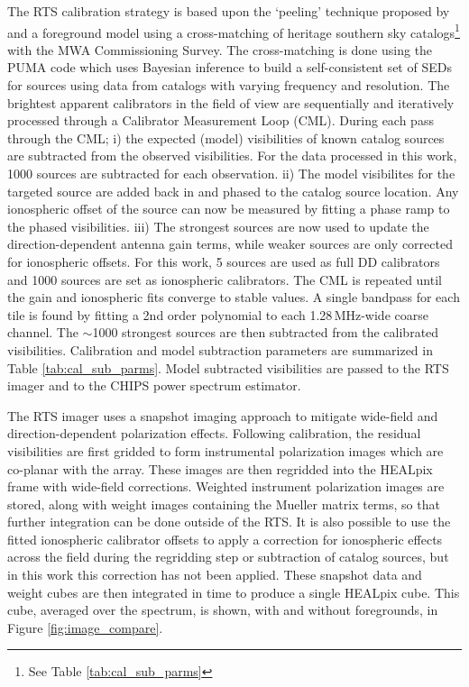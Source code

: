 \documentclass[twolcolumn,iop]{emulateapj}
\begin{document}
The RTS calibration strategy is based upon the `peeling' technique proposed by \cite{Noordam:2004p2379} and a foreground model using a cross-matching of heritage southern sky catalogs\footnote{See Table \ref{tab:cal_sub_parms}} with the MWA Commissioning Survey.  The cross-matching is done using the PUMA code which uses Bayesian inference to build a self-consistent set of SEDs for sources using data from catalogs with varying frequency and resolution. The brightest apparent calibrators in the field of view are sequentially and iteratively processed through a Calibrator Measurement Loop (CML). During each pass through the CML; i) the expected (model) visibilities of known catalog sources are subtracted from the observed visibilities. For the data processed in this work, 1000 sources are subtracted for each observation. ii) The model visibilites for the targeted source are added back in and phased to the catalog source location. Any ionospheric offset of the source can now be measured by fitting a phase ramp to the phased visibilities. iii) The strongest sources are now used to update the direction-dependent antenna gain terms, while weaker sources are only corrected for ionospheric offsets. For this work, 5 sources are used as full DD calibrators and 1000 sources are set as ionospheric calibrators. The CML is repeated until the gain and ionospheric fits converge to stable values. A single bandpass for each tile is found by fitting a 2nd order polynomial to each 1.28\,MHz-wide coarse channel. The $\sim$1000 strongest sources are then subtracted from the calibrated visibilities.   Calibration and model subtraction parameters are summarized in Table \ref{tab:cal_sub_parms}.  Model subtracted visibilities are passed to the RTS imager and to the CHIPS power spectrum estimator. 

The RTS imager uses a snapshot imaging approach to mitigate wide-field and direction-dependent polarization effects. Following calibration, the residual visibilities are first gridded to form instrumental polarization images which are co-planar with the array. These images are then regridded into the HEALpix \citep{Gorski:2005p7667} frame with wide-field corrections.  Weighted instrument polarization images are stored, along with weight images containing the Mueller matrix terms, so that further integration can be done outside of the RTS. It is also possible to use the fitted ionospheric calibrator offsets to apply a correction for ionospheric effects across the field during the regridding step or subtraction of catalog sources, but in this work this correction has not been applied. These snapshot data and weight cubes are then integrated in time to produce a single HEALpix cube. This cube, averaged over the spectrum, is shown, with and without foregrounds, in Figure \ref{fig:image_compare}.
\end{document}

